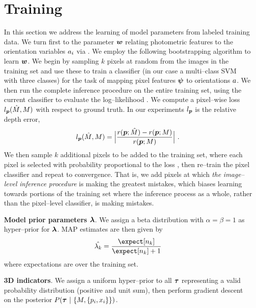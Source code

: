 \section{Training}
In this section we address the learning of model parameters from
labeled training data. We turn first to the parameter $\boldsymbol{w}$
relating photometric features to the orientation variables $a_i$
via . We employ the following bootstrapping
algorithm to learn $\boldsymbol{w}$. We begin by sampling $k$ pixels at
random from the images in the training set and use these to train a
classifier (in our case a multi--class SVM with three classes) for the
task of mapping pixel features $\boldsymbol{\psi}$ to orientations
$a$. We then run the complete inference procedure on the entire
training set, using the current classifier to evaluate the
log--likelihood . We compute a pixel--wise loss
$l_{\boldsymbol{p}}(\hat{M},M)$ with respect to ground truth. In
our experiments $l_{\boldsymbol{p}}$ is the relative depth error,
\begin{equation}
  \label{eq:loss}
  l_{\boldsymbol{p}}(\hat{M},M) = 
  \Bigl| \frac{r(\boldsymbol{p};\hat{M}) - r(\boldsymbol{p};M)}
    {r(\boldsymbol{p};M)}\Bigr| ~.
\end{equation}
We then sample $k$ additional pixels to be added to the training set,
where each pixel is selected with probability proportional to the loss
, then re--train the pixel classifier and repeat to
convergence. That is, we add pixels at which \textit{the image--level
  inference procedure} is making the greatest mistakes, which biases
learning towards portions of the training set where the inference
process as a whole, rather than the pixel--level classifier, is making
mistakes.

\textbf{Model prior parameters $\boldsymbol{\lambda}$}. We assign a beta distribution
with $\alpha=\beta=1$ as hyper--prior for $\boldsymbol{\lambda}$. MAP estimates
are then given by
\begin{equation}
  \hat{\lambda_k} = \frac{\expect[n_k]}{\expect[n_k]+1}
\end{equation}
where expectations are over the training set.

\textbf{3D indicators}. We assign a uniform hyper--prior to all
$\boldsymbol{\tau}$ representing a valid probability distribution (\ie positive
and unit sum), then perform gradient descent on the posterior
$P(\boldsymbol{\tau}~|~\{M,\{p_i,x_i\}\})$.

